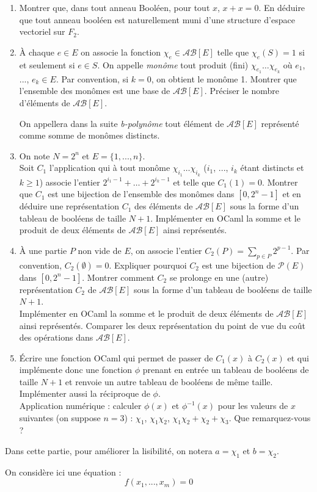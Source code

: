 \begin{enumerate}
    \item Montrer que, dans tout anneau Booléen, pour tout $x$, $x+x=0$. En déduire que tout anneau booléen est naturellement muni d'une structure d'espace vectoriel sur $F_2$.
    \item À chaque $e \in E$ on associe la fonction $\chi_e \in \mathcal{AB}[E]$ telle que $\chi_e(S)=1$ si et seulement si $e \in S$. On appelle \textit{monôme} tout produit (fini) $\chi_{e_1}\dots\chi_{e_k}$ où $e_1$, ..., $e_k \in E$. Par convention, si $k=0$, on obtient le monôme 1. Montrer que l'ensemble des monômes est une base de $\mathcal{AB}[E]$. Préciser le nombre d'éléments de $\mathcal{AB}[E]$.
    \smallskip

    On appellera dans la suite \textit{b-polynôme} tout élément de $\mathcal{AB}[E]$ représenté comme somme de monômes distincts.
    \item On note $N=2^n$ et $E=\{1, ..., n\}$.\\
    Soit $C_1$ l'application qui à tout monôme $\chi_{i_1}\dots\chi_{i_k}$ ($i_1$, ..., $i_k$ étant distincts et $k \geq 1$) associe l'entier $2^{i_1-1} + \dots + 2^{i_k-1}$ et telle que $C_1(1)=0$. Montrer que $C_1$ est une bijection de l'ensemble des monômes dans $[0,2^n-1]$ et en déduire une représentation $C_1$ des éléments de $\mathcal{AB}[E]$ sous la forme d'un tableau de booléens de taille $N+1$. Implémenter en OCaml la somme et le produit de deux éléments de $\mathcal{AB}[E]$ ainsi représentés.
    \item À une partie $P$ non vide de $E$, on associe l'entier $C_2(P) = \sum_{p \in P}2^{p-1}$. Par convention, $C_2(\emptyset)=0$. Expliquer pourquoi $C_2$ est une bijection de $\mathcal{P}(E)$ dans $[0, 2^n-1]$. Montrer comment $C_2$ se \og prolonge \fg{} en une (autre) représentation $C_2$ de $\mathcal{AB}[E]$ sous la forme d'un tableau de booléens de taille $N+1$.\\
    Implémenter en OCaml la somme et le produit de deux éléments de $\mathcal{AB}[E]$ ainsi représentés. Comparer les deux représentation du point de vue du coût des opérations dans $\mathcal{AB}[E]$.
    \item Écrire une fonction OCaml qui permet de passer de $C_1(x)$ à $C_2(x)$ et qui implémente donc une fonction $\phi$ prenant en entrée un tableau de booléens de taille $N+1$ et renvoie un autre tableau de booléens de même taille. Implémenter aussi la réciproque de $\phi$.\\
    Application numérique : calculer $\phi(x)$ et $\phi^{-1}(x)$ pour les valeurs de $x$ suivantes (on suppose $n=3$) : $\chi_1$, $\chi_1\chi_2$, $\chi_1\chi_2+\chi_2+\chi_3$. Que remarquez-vous ?
\end{enumerate}


Dans cette partie, pour améliorer la lisibilité, on notera $a=\chi_1$ et $b=\chi_2$.
\medskip

On considère ici une équation :
\begin{equation}\label{eq:1}
    f(x_1, ..., x_m) = 0
\end{equation}
